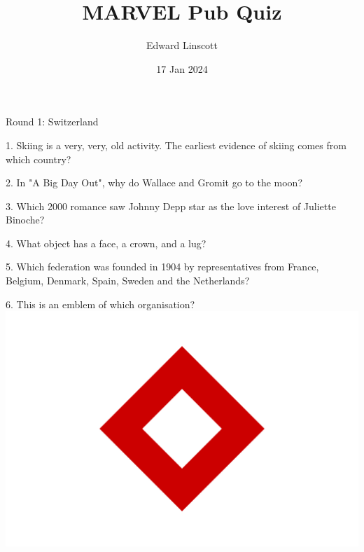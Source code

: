 
\title{MARVEL Pub Quiz}
\author{Edward Linscott}
\date{17 Jan 2024}

\frame{\titlepage}

\begin{frame}
\begin{center}
\Huge
Round 1: Switzerland
\end{center}
\end{frame}
\begin{frame}
\begin{center}
\Large
1. Skiing is a very, very, old activity. The earliest evidence of skiing comes from which country?
\end{center}
\end{frame}
\begin{frame}
\begin{center}
\Large
2. In "A Big Day Out", why do Wallace and Gromit go to the moon?
\end{center}
\end{frame}
\begin{frame}
\begin{center}
\Large
3. Which 2000 romance saw Johnny Depp star as the love interest of Juliette Binoche?
\end{center}
\end{frame}
\begin{frame}
\begin{center}
\Large
4. What object has a face, a crown, and a lug?
\end{center}
\end{frame}
\begin{frame}
\begin{center}
\Large
5. Which federation was founded in 1904 by representatives from France, Belgium, Denmark, Spain, Sweden and the Netherlands?
\end{center}
\end{frame}
\begin{frame}
\begin{center}
\Large
6. This is an emblem of which organisation?
\\
\vspace{0.5em}\includegraphics[height=0.6\paperheight]{images/red_crystal.png}
\end{center}
\end{frame}
